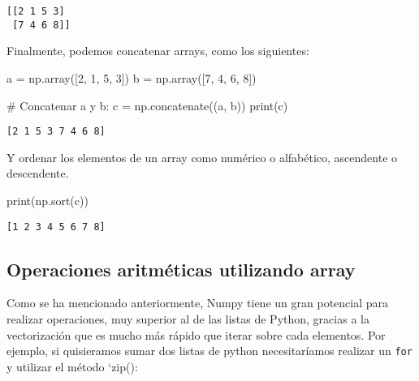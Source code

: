\documentclass[
  letterpaper,
  DIV=11,
  numbers=noendperiod]{scrreprt}
\newenvironment{Shaded}{\begin{snugshade}}{\end{snugshade}}
\newcommand{\BuiltInTok}[1]{\textcolor[rgb]{0.00,0.23,0.31}{#1}}
\newcommand{\CommentTok}[1]{\textcolor[rgb]{0.37,0.37,0.37}{#1}}
\newcommand{\DecValTok}[1]{\textcolor[rgb]{0.68,0.00,0.00}{#1}}
\newcommand{\NormalTok}[1]{\textcolor[rgb]{0.00,0.23,0.31}{#1}}
\newcommand{\OperatorTok}[1]{\textcolor[rgb]{0.37,0.37,0.37}{#1}}
\begin{document}
\begin{verbatim}
[[2 1 5 3]
 [7 4 6 8]]
\end{verbatim}

Finalmente, podemos concatenar arrays, como los siguientes:

\begin{Shaded}
\begin{Highlighting}[]
\NormalTok{a }\OperatorTok{=}\NormalTok{ np.array([}\DecValTok{2}\NormalTok{, }\DecValTok{1}\NormalTok{, }\DecValTok{5}\NormalTok{, }\DecValTok{3}\NormalTok{])}
\NormalTok{b }\OperatorTok{=}\NormalTok{ np.array([}\DecValTok{7}\NormalTok{, }\DecValTok{4}\NormalTok{, }\DecValTok{6}\NormalTok{, }\DecValTok{8}\NormalTok{])}

\CommentTok{\# Concatenar a y b:}
\NormalTok{c }\OperatorTok{=}\NormalTok{ np.concatenate((a, b))}
\BuiltInTok{print}\NormalTok{(c)}
\end{Highlighting}
\end{Shaded}

\begin{verbatim}
[2 1 5 3 7 4 6 8]
\end{verbatim}

Y ordenar los elementos de un array como numérico o alfabético,
ascendente o descendente.

\begin{Shaded}
\begin{Highlighting}[]
\BuiltInTok{print}\NormalTok{(np.sort(c))}
\end{Highlighting}
\end{Shaded}

\begin{verbatim}
[1 2 3 4 5 6 7 8]
\end{verbatim}

\subsection{\texorpdfstring{Operaciones aritméticas utilizando
\textbf{array}}{Operaciones aritméticas utilizando array}}\label{operaciones-aritmuxe9ticas-utilizando-array}

Como se ha mencionado anteriormente, Numpy tiene un gran potencial para
realizar operaciones, muy superior al de las listas de Python, gracias a
la vectorización que es mucho más rápido que iterar sobre cada
elementos. Por ejemplo, si quisieramos sumar dos listas de python
necesitaríamos realizar un \texttt{for} y utilizar el método `zip():
\end{document}
